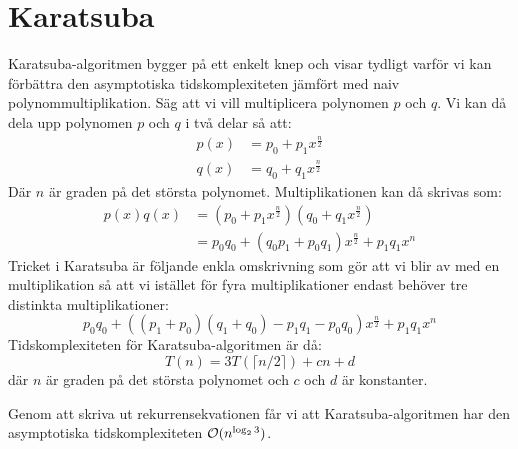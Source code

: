 \section{Karatsuba}
Karatsuba-algoritmen bygger på ett enkelt knep och visar tydligt varför vi kan
förbättra den asymptotiska tidskomplexiteten jämfört med naiv
polynommultiplikation. Säg att vi vill multiplicera polynomen $p$ och $q$. Vi
kan då dela upp polynomen $p$ och $q$ i två delar så att:
\begin{align*}
  p(x) &= p_0 + p_1 x^{\frac{n}{2}} \\
  q(x) &= q_0 + q_1 x^{\frac{n}{2}}
\end{align*}
Där $n$ är graden på det största polynomet. Multiplikationen kan då skrivas
som:
\begin{align*}
p(x)q(x) &= (p_0 + p_1 x^{\frac{n}{2}})(q_0 + q_1 x^{\frac{n}{2}}) \\
         &= p_0 q_0  + (q_0 p_1 +p_0 q_1 )  x^{\frac{n}{2}} + p_1 q_1  x^n
\end{align*}
Tricket i Karatsuba är följande enkla omskrivning som gör att vi blir av med en
multiplikation så att vi istället för fyra multiplikationer endast behöver tre
distinkta multiplikationer:
\begin{equation*}
  p_0 q_0 + ((p_1 + p_0)(q_1 + q_0) - p_1 q_1 - p_0 q_0)  x^{\frac{n}{2}} + p_1 q_1  x^n
\end{equation*}
Tidskomplexiteten för Karatsuba-algoritmen är då:
\begin{equation*}
  T(n) = 3 T(\lceil n/2\rceil) + cn + d
\end{equation*}
där $n$ är graden på det största polynomet och $c$ och $d$ är konstanter.

Genom att skriva ut rekurrensekvationen får vi att Karatsuba-algoritmen har den
asymptotiska tidskomplexiteten $\mathcal{O}(n^{\log_2 3})$.
